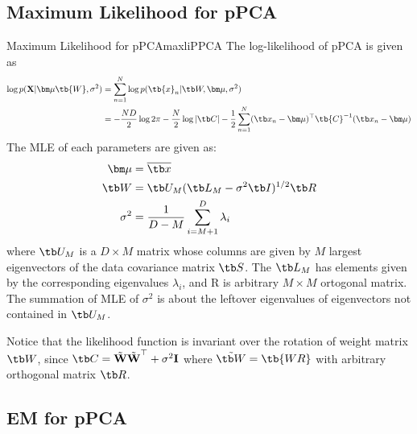 \documentclass{article}
\begin{document}
    \subsection{Maximum Likelihood for pPCA}
        \begin{thm}{Maximum Likelihood for pPCA}{maxliPPCA}
            The log-likelihood of pPCA is given as
            \begin{align*}
                \log{p(\textbf{X}|\bm\mu\tb{W},\sigma^2)} &= \sum_{n=1}^{N}\log{p(\tb{x}_n|\tb W, \bm\mu,\sigma^2)} \\
                &= -\frac{ND}{2}\log{2\pi}-\frac{N}{2}\log{|\tb C|}-\frac{1}{2}\sum_{n=1}^{N}(\tb x_n -\bm\mu)^\top\tb{C}^{-1}(\tb x_n - \bm\mu)
            \end{align*}
            The MLE of each parameters are given as:
            \begin{align*}
                \bm\mu &= \overline{\tb x} \\
                \tb W &= \tb U_M(\tb L_M -\sigma^2\tb I)^{1/2}\tb R \\
                \sigma^2 &=\frac{1}{D-M}\sum_{i=M+1}^{D}\lambda_i
            \end{align*}
            where $\tb U_M$ is a $D \times M$ matrix whose columns are given by $M$ largest eigenvectors of the data covariance matrix $\tb S$.
            The $\tb L_M$ has elements given by the corresponding eigenvalues $\lambda_i$, and \tb R is arbitrary $M \times M$ ortogonal matrix.
            The summation of MLE of $\sigma^2$ is about the leftover eigenvalues of eigenvectors not contained in $\tb U_M$. 
        \end{thm}
        Notice that the likelihood function is invariant over the rotation of weight matrix $\tb W$,
        since $\tb C = \tilde{\textbf{W}}\tilde{\textbf{W}}^\top + \sigma^2\textbf{I}$ where $\tilde{\tb W}=\tb{WR}$ with arbitrary orthogonal matrix $\tb R$.

    \subsection{EM for pPCA}
\end{document}
